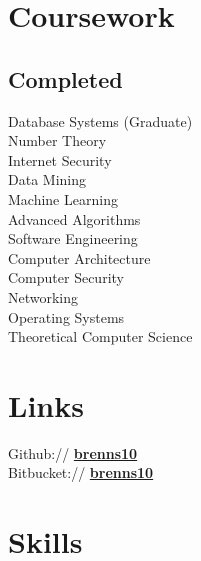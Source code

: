 \documentclass[letterpaper]{deedy-resume} %
\newcommand{\bul}{\textbullet{}}
\begin{document}
\begin{minipage}[t]{0.33\textwidth}
\sectionspace %


\section{Coursework}

\subsection{Completed}

Database Systems (Graduate) \\%
Number Theory \\
Internet Security \\%
Data Mining \\%
Machine Learning \\%
Advanced Algorithms \\%
Software Engineering \\%
Computer Architecture \\%
Computer Security \\%
Networking \\%
Operating Systems \\%
Theoretical Computer Science


\sectionspace %


\section{Links}

Github:// \href{https://github.com/brenns10}{\bf brenns10} \\
Bitbucket:// \href{https://bitbucket.org/brenns10}{\bf brenns10} \\

\sectionspace %


\section{Skills}


\end{minipage}
\end{document}
